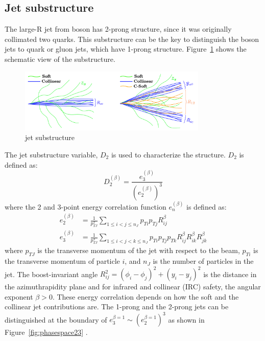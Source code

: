 \subsection{Jet substructure}
The large-R jet from boson has 2-prong structure, since it was originally collimated two quarks. This substructure can be the key to distinguish the boson jets to quark or gluon jets, which have 1-prong structure.
Figure~\ref{fig:jetsub} shows the schematic view of the substructure.
 \begin{figure}[tbp]
    \begin{center}
    \includegraphics[width=0.80\textwidth,keepaspectratio]{figures/Reconstruction/jetsub}
    \caption{
    jet substructure \cite{Larkoski_2014}
    }
    \label{fig:jetsub}
    \end{center}
    \end{figure}
The jet substructure variable, $D_2$ is used to characterize the structure.  $D_2$ is defined as:
\begin{equation}
D_{2}^{(\beta)}=\frac{e_{3}^{(\beta)}}{\left(e_{2}^{(\beta)}\right)^{3}}
\end{equation}
where the 2 and 3-point energy correlation function $e_{n}^{(\beta)}$ is defined as:
\begin{equation}
\begin{aligned}
e_{2}^{(\beta)} &=\frac{1}{p_{T J}^{2}} \sum_{1 \leq i<j \leq n_{J}} p_{T i} p_{T j} R_{i j}^{\beta} \\
e_{3}^{(\beta)} &=\frac{1}{p_{T J}^{3}} \sum_{1 \leq i<j<k \leq n_{J}} p_{T i} p_{T j} p_{T k} R_{i j}^{\beta} R_{i k}^{\beta} R_{j k}^{\beta}
\end{aligned}
\end{equation}
where $p_{T J}$ is the transverse momentum of the jet with respect to the beam, $p_{T i}$ is the transverse momentum of particle $i$, and $n_{J}$ is the number of particles in the jet. 
The boost-invariant angle $R_{ij}^{2}=\left(\phi_{i}-\phi_{j}\right)^{2}+\left(y_{i}-y_{j}\right)^{2}$ is the distance in the azimuthrapidity plane and for infrared and collinear (IRC) safety, the angular exponent $\beta>0$. 
These energy correlation depends on how the soft and the collinear jet contributions are. The 1-prong and the 2-prong jets can be distinguished at the boundary of $e_{3}^{\beta=1} \sim\left(e_{2}^{\beta=1}\right)^{3}$ as shown in Figure~\ref{fig:phasespace23} \cite{Larkoski_2014}. 
